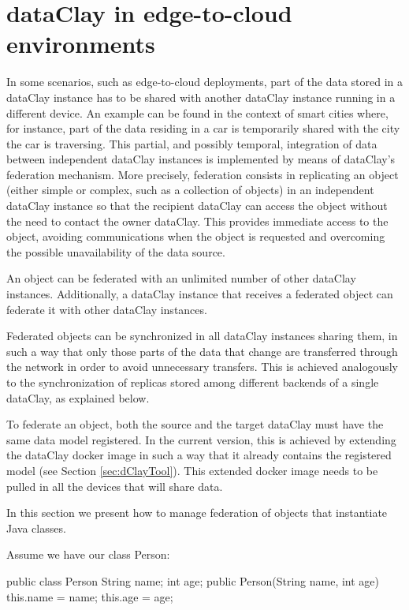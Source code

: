 \section{dataClay in edge-to-cloud environments}
\label{sec:jFederation}

In some scenarios, such as edge-to-cloud deployments, part of the data stored in a dataClay instance has to be shared with another dataClay instance running in a different device. An example can be found in the context of smart cities where, for instance, part of the data residing in a car is temporarily shared with the city the car is traversing. This partial, and possibly temporal, integration of data between independent dataClay instances is implemented by means of dataClay's federation mechanism.
More precisely, federation consists in replicating an object (either simple or complex, such as a collection of objects) in an independent dataClay instance so that the recipient dataClay can access the object without the need to contact the owner dataClay. This provides immediate access to the object, avoiding communications when the object is requested and overcoming the possible unavailability of the data source. 

An object can be federated with an unlimited number of other dataClay instances. Additionally, a dataClay instance that receives a federated object can federate it with other dataClay instances.

Federated objects can be synchronized in all dataClay instances sharing them, in such a way that only those parts of the data that change are transferred through the network in order to avoid unnecessary transfers. This is achieved analogously to the synchronization of replicas stored among different backends of a single dataClay, as explained below. 

To federate an object, both the source and the target dataClay must have the same data model registered. In the current version, this is achieved by extending the dataClay docker image in such a way that it already contains the registered model (see Section \ref{sec:dClayTool}). This extended docker image needs to be pulled in all the devices that will share data.

In this section we present how to manage federation of objects that instantiate Java classes. 

Assume we have our class Person:

\begin{tBox}
\begin{java}
public class Person {
  String name;
  int age;
  public Person(String name, int age) {
    this.name = name;
    this.age = age;
  }
}
\end{java}
\end{tBox}

